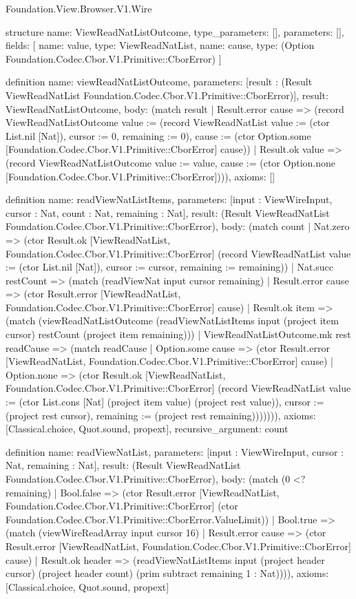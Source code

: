 \begin{lexlean}{Foundation.View.Browser.V1.Wire}
\begin{semanticmodule}
structure{
  name: ViewReadNatListOutcome,
  type_parameters: [],
  parameters: [],
  fields: [
    {name: value, type: ViewReadNatList},
    {name: cause, type: (Option Foundation.Codec.Cbor.V1.Primitive::CborError)}
  ]
}

definition{
  name: viewReadNatListOutcome,
  parameters: [result : (Result ViewReadNatList Foundation.Codec.Cbor.V1.Primitive::CborError)],
  result: ViewReadNatListOutcome,
  body: (match result
    | Result.error cause => (record ViewReadNatListOutcome {value := (record ViewReadNatList {value := (ctor List.nil [Nat]), cursor := 0, remaining := 0}), cause := (ctor Option.some [Foundation.Codec.Cbor.V1.Primitive::CborError] cause)})
    | Result.ok value => (record ViewReadNatListOutcome {value := value, cause := (ctor Option.none [Foundation.Codec.Cbor.V1.Primitive::CborError])})),
  axioms: []
}

definition{
  name: readViewNatListItems,
  parameters: [input : ViewWireInput, cursor : Nat, count : Nat, remaining : Nat],
  result: (Result ViewReadNatList Foundation.Codec.Cbor.V1.Primitive::CborError),
  body: (match count
    | Nat.zero => (ctor Result.ok [ViewReadNatList, Foundation.Codec.Cbor.V1.Primitive::CborError] (record ViewReadNatList {value := (ctor List.nil [Nat]), cursor := cursor, remaining := remaining}))
    | Nat.succ restCount => (match (readViewNat input cursor remaining)
      | Result.error cause => (ctor Result.error [ViewReadNatList, Foundation.Codec.Cbor.V1.Primitive::CborError] cause)
      | Result.ok item => (match (viewReadNatListOutcome (readViewNatListItems input (project item cursor) restCount (project item remaining)))
        | ViewReadNatListOutcome.mk rest readCause => (match readCause
          | Option.some cause => (ctor Result.error [ViewReadNatList, Foundation.Codec.Cbor.V1.Primitive::CborError] cause)
          | Option.none => (ctor Result.ok [ViewReadNatList, Foundation.Codec.Cbor.V1.Primitive::CborError] (record ViewReadNatList {value := (ctor List.cons [Nat] (project item value) (project rest value)), cursor := (project rest cursor), remaining := (project rest remaining)})))))),
  axioms: [Classical.choice, Quot.sound, propext],
  recursive_argument: count
}

definition{
  name: readViewNatList,
  parameters: [input : ViewWireInput, cursor : Nat, remaining : Nat],
  result: (Result ViewReadNatList Foundation.Codec.Cbor.V1.Primitive::CborError),
  body: (match (0 <? remaining)
    | Bool.false => (ctor Result.error [ViewReadNatList, Foundation.Codec.Cbor.V1.Primitive::CborError] (ctor Foundation.Codec.Cbor.V1.Primitive::CborError.ValueLimit))
    | Bool.true => (match (viewWireReadArray input cursor 16)
      | Result.error cause => (ctor Result.error [ViewReadNatList, Foundation.Codec.Cbor.V1.Primitive::CborError] cause)
      | Result.ok header => (readViewNatListItems input (project header cursor) (project header count) (prim subtract remaining 1 : Nat)))),
  axioms: [Classical.choice, Quot.sound, propext]
}


\end{semanticmodule}
\end{lexlean}
